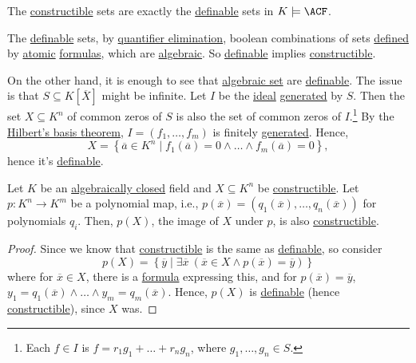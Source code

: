 \begin{remark}
	The \hyperref[def:constructible]{constructible} sets are exactly the \hyperref[def:definable]{definable} sets in \(K \models \ACF\).
\end{remark}
\begin{explanation}
	The \hyperref[def:definable]{definable} sets, by \hyperref[def:quantifier-elimination]{quantifier elimination}, boolean combinations of sets \hyperref[def:definable]{defined} by \hyperref[not:atomic]{atomic} \hyperref[def:formula]{formulas}, which are \hyperref[def:algebraic-set]{algebraic}. So \hyperref[def:definable]{definable} implies \hyperref[def:constructible]{constructible}.

	On the other hand, it is enough to see that \hyperref[def:algebraic-set]{algebraic set} are \hyperref[def:definable]{definable}. The issue is that \(S \subseteq K[\overline{X} ]\) might be infinite. Let \(I\) be the \hyperref[def:ideal]{ideal} \hyperref[def:ideal-generation]{generated} by \(S\). Then the set \(X \subseteq K^n\) of common zeros of \(S\) is also the set of common zeros of \(I\).\footnote{Each \(f\in I\) is \(f = r_1 g_1 + \dots + r_n g_n\), where \(g_1, \dots , g_n \in S\).} By the \hyperref[thm:Hilbert-basis]{Hilbert's basis theorem}, \(I = (f_1, \dots , f_m)\) is finitely \hyperref[def:ideal-generation]{generated}. Hence,
	\[
		X = \left\{ \overline{a} \in K^n \mid f_1(\overline{a} ) = 0 \land \dots \land f_{m}(\overline{a} ) = 0  \right\},
	\]
	hence it's \hyperref[def:definable]{definable}.
\end{explanation}

\begin{theorem}\label{def:Chevalley}
	Let \(K\) be an \hyperref[def:algebraically-closed]{algebraically closed} field and \(X \subseteq K^n\) be \hyperref[def:constructible]{constructible}. Let \(p \colon K^n \to K^m\) be a polynomial map, i.e., \(p(\overline{x} ) = (q_1(\overline{x} ), \dots , q_n(\overline{x} ))\) for polynomials \(q_i\). Then, \(p(X)\), the image of \(X\) under \(p\), is also \hyperref[def:constructible]{constructible}.
\end{theorem}
\begin{proof}
	Since we know that \hyperref[def:constructible]{constructible} is the same as \hyperref[def:definable]{definable}, so consider
	\[
		p(X) = \left\{ \overline{y} \mid \exists \overline{x} \ (\overline{x} \in X \land p(\overline{x} ) = \overline{y} ) \right\}
	\]
	where for \(\overline{x} \in X\), there is a \hyperref[def:formula]{formula} expressing this, and for \(p(\overline{x} ) = \overline{y} \), \(y_1 = q_1(\overline{x} ) \land \dots \land y_m=q_m(\overline{x} )\). Hence, \(p(X)\) is \hyperref[def:definable]{definable} (hence \hyperref[def:constructible]{constructible}), since \(X\) was.
\end{proof}

